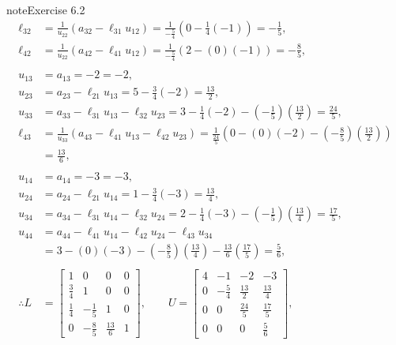 \documentclass[letterpaper,10pt,english]{jupyterBook}
\begin{document}
\begin{sphinxadmonition}{note}{Exercise 6.2}
\begin{align*}
    \ell_{32} &= \frac{1}{u_{22}}\left(a_{32} - \ell_{31} u_{12}\right) = \frac{1}{- \frac{5}{4}}\left(0 - \frac{1}{4}\left(-1\right)\right) = - \frac{1}{5}, \\
    \ell_{42} &= \frac{1}{u_{22}}\left(a_{42} - \ell_{41} u_{12}\right) = \frac{1}{- \frac{5}{4}}\left(2 - \left(0\right)\left(-1\right)\right) = - \frac{8}{5}, \\
    \\
    u_{13} &= a_{13} = -2 = -2, \\
    u_{23} &= a_{23} - \ell_{21} u_{13} = 5 - \frac{3}{4}\left(-2\right) = \frac{13}{2}, \\
    u_{33} &= a_{33} - \ell_{31} u_{13} - \ell_{32} u_{23} = 3 - \frac{1}{4}\left(-2\right) - \left(- \frac{1}{5}\right)\left(\frac{13}{2}\right) = \frac{24}{5}, \\
    \ell_{43} &= \frac{1}{u_{33}}\left(a_{43} - \ell_{41} u_{13} - \ell_{42} u_{23}\right) = \frac{1}{\frac{24}{5}}\left(0 - \left(0\right)\left(-2\right) - \left(- \frac{8}{5}\right)\left(\frac{13}{2}\right)\right) \\
    &= \frac{13}{6}, \\
    \\
    u_{14} &= a_{14} = -3 = -3, \\
    u_{24} &= a_{24} - \ell_{21} u_{14} = 1 - \frac{3}{4}\left(-3\right) = \frac{13}{4}, \\
    u_{34} &= a_{34} - \ell_{31} u_{14} - \ell_{32} u_{24} = 2 - \frac{1}{4}\left(-3\right) - \left(- \frac{1}{5}\right)\left(\frac{13}{4}\right) = \frac{17}{5}, \\
    u_{44} &= a_{44} - \ell_{41} u_{14} - \ell_{42} u_{24} - \ell_{43} u_{34} \\
    &= 3 - \left(0\right)\left(-3\right) - \left(- \frac{8}{5}\right)\left(\frac{13}{4}\right) - \frac{13}{6}\left(\frac{17}{5}\right) = \frac{5}{6}, \\
    \\
    \therefore L &= \left[\begin{matrix}1 & 0 & 0 & 0\\\frac{3}{4} & 1 & 0 & 0\\\frac{1}{4} & - \frac{1}{5} & 1 & 0\\0 & - \frac{8}{5} & \frac{13}{6} & 1\end{matrix}\right], \qquad
    U = \left[\begin{matrix}4 & -1 & -2 & -3\\0 & - \frac{5}{4} & \frac{13}{2} & \frac{13}{4}\\0 & 0 & \frac{24}{5} & \frac{17}{5}\\0 & 0 & 0 & \frac{5}{6}\end{matrix}\right], \\

\end{align*}
\end{sphinxadmonition}
\end{document}
